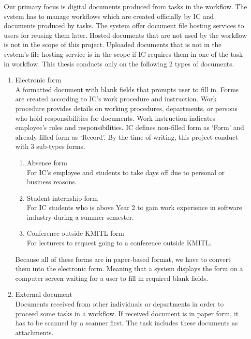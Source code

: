 Our primary focus is digital documents produced from tasks in the workflow.
The system has to manage workflows which are created officially by IC and documents produced by tasks.
The system offer document file hosting services to users for reusing them later.
Hosted documents that are not used by the workflow is not in the scope of this project.
Uploaded documents that is not in the system's file hosting service is in the scope if IC requires them in one of the task in workflow.
This thesis conducts only on the following 2 types of documents.
\begin{enumerate}
\item Electronic form \hfill \\
A formatted document with blank fields that prompts user to fill in.
Forms are created according to IC's work procedure and instruction.
Work procedure provides details on working procedures, departments, or persons who hold responsibilities for documents.
Work instruction indicates employee's roles and responsibilities.
IC defines non-filled form as \enquote*{Form} and already filled form as \enquote*{Record}.
By the time of writing, this project conduct with 3 sub-types forms.
\begin{enumerate}
\item Absence form \hfill \\
For IC's employee and students to take days off due to personal or business reasons.
\item Student internship form \hfill \\
For IC students who is above Year 2 to gain work experience in software industry during a summer semester.
\item Conference outside KMITL form \hfill \\
For lecturers to request going to a conference outside KMITL.
\end{enumerate}
Because all of these forms are in paper-based format, we have to convert them into the electronic form.
Meaning that a system displays the form on a computer screen waiting for a user to fill in required blank fields.
\item External document \hfill \\
Documents received from other individuals or departments in order to proceed some tasks in a workflow.
If received document is in paper form, it has to be scanned by a scanner first.
The task includes these documents as attachments.
\end{enumerate}

